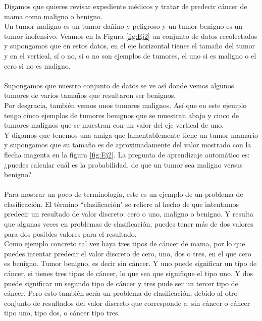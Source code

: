 \documentclass{book}
\begin{document}
Digamos que quieres revisar
expediente médicos y tratar de predecir cáncer de mama como maligno o benigno. \\Un tumor maligno es un
tumor dañino y peligroso y un tumor benigno es un tumor inofensivo.
Veamos  en la Figura \ref{fig:Ej2} un conjunto de datos recolectados y supongamos
que en estos datos, en el eje horizontal tienes el tamaño del tumor y
en el vertical, sí o no, si o no son
ejemplos de tumores, el uno si es maligno o el cero si no es maligno.\\\\ Supongamos que nuestro conjunto de datos se ve así donde vemos algunos tumores de varios 
tamaños que resultaron ser benignos.\\
Por desgracia, también vemos unos tumores malignos. Así que en este ejemplo tengo cinco ejemplos de tumores
benignos que se muestran abajo y cinco de tumores malignos que se muestran con un
valor del eje vertical de uno.\\ Y digamos que tenemos una amiga que lamentablemente tiene un
tumor mamario y supongamos que su tamaño es de aproximadamente del valor mostrado con la flecha magenta en la figura \ref{fig:Ej2}. La
pregunta de aprendizaje automático es: ¿puedes calcular cuál es la probabilidad,
de que un tumor sea maligno versus benigno?\\\\ Para mostrar un poco
de terminología, este es un ejemplo de un problema de clasificación. El término
``clasificación" se refiere al hecho de que intentamos predecir un resultado
de valor discreto: cero o uno, maligno o benigno. Y resulta que algunas veces
en problemas de clasificación, puedes tener más de dos valores para dos
posibles valores para el resultado.\\ Como ejemplo concreto tal vez haya tres
tipos de cáncer de mama, por lo que puedes intentar predecir el valor discreto de cero,
uno, dos o tres, en el que cero es benigno. Tumor benigno, es decir sin cáncer. Y uno puede
significar un tipo de cáncer, si tienes tres tipos de cáncer, lo que sea que signifique
el tipo uno. Y dos puede significar un segundo tipo de cáncer y tres pude ser un tercer tipo de
cáncer. Pero esto también sería un problema de clasificación, debido al otro
conjunto de resultados del valor discreto que corresponde a: sin cáncer o cáncer tipo
uno, tipo dos, o cáncer tipo tres.\\\\
\end{document}
